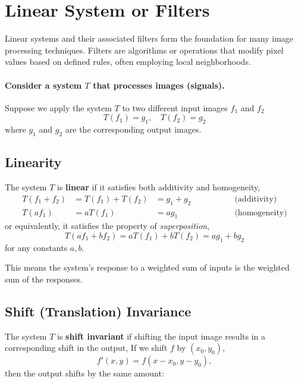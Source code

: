 \section{Linear System or Filters}

Linear systems and their associated filters form the foundation for many image processing techniques. Filters are algorithms or operations that modify pixel values based on defined rules, often employing local neighborhoods.

\paragraph{Consider a system \( T \) that processes images (signals).}

Suppose we apply the system \( T \) to two different input images \( f_1 \) and \( f_2 \)
\[
T(f_1) = g_1, \quad T(f_2) = g_2
\]
where \( g_1 \) and \( g_2 \) are the corresponding output images.

\subsection{Linearity}
The system \( T \) is \textbf{linear} if it satisfies both additivity and homogeneity, 
\begin{align*}
T(f_1 + f_2) &= T(f_1) + T(f_2) &= g_1 + g_2 \qquad \qquad &\text{(additivity)} \\
T(a f_1) &= a T(f_1) &= a g_1  \qquad \qquad \qquad  &\text{(homogeneity)} 
\end{align*}
or equivalently, it satisfies the property of \textit{superposition},
\[
T(a f_1 + b f_2) = a T(f_1) + b T(f_2) = a g_1 + b g_2
\]
for any constants \( a, b \).

This means the system's response to a weighted sum of inputs is the weighted sum of the responses.


\subsection{Shift (Translation) Invariance}

The system \( T \) is \textbf{shift invariant} if shifting the input image results in a corresponding shift in the output, If we shift \( f \) by \((x_0,y_0)\),
\[
f'(x,y) = f(x - x_0, y - y_0),
\]
then the output shifts by the same amount:

